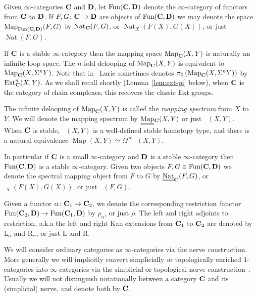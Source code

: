 \documentclass[psamsfonts]{amsart}
\theoremstyle{plain}
\theoremstyle{definition}
\theoremstyle{remark}
\newcommand{\catname}[1]{{\normalfont\textbf{#1}}}
\newcommand{\lkan}{\mathrm{L}}
\newcommand{\rkan}{\mathrm{R}}
\DeclareMathOperator{\ext}{Ext}
\DeclareMathOperator{\map}{Map}
\DeclareMathOperator{\spectralmaps}{\underline{\underline{\map}}}
\DeclareMathOperator{\nat}{Nat}
\DeclareMathOperator{\spectralNat}{\underline{\underline{\nat}}}
\DeclareMathOperator{\fun}{Fun}
\begin{document}
Given $\infty$-categories $\catname{C}$ and $\catname{D}$, let $\fun(\catname{C}, \catname{D})$ denote the $\infty$-category of functors from $\catname{C}$ to $\catname{D}$. If $F, G\colon \catname{C}\to \catname{D}$ are objects of $\fun(\catname{C}, \catname{D})$ we may denote the space $\map_{\fun(\catname{C}, \catname{D})}(F, G)$ by $\nat_{\catname{C}}(F, G)$, or $\nat_X(F(X), G(X))$, or just $\nat(F, G)$. 

If $\catname{C}$ is a stable $\infty$-category then the mapping space $\map_{\catname{C}}(X, Y)$ is naturally an infinite loop space. The $n$-fold delooping of $\map_{\catname{C}}(X, Y)$ is equivalent to $\map_{\catname{C}}(X, \Sigma^n Y)$. Note that in~\cite{LurieHA} Lurie sometimes denotes $\pi_0\left(\map_{\catname{C}}(X, \Sigma^n Y)\right)$ by $\ext^n_{\catname{C}}(X, Y)$. As we shall recall shortly (Lemma~\ref{lem:ext-pi} below), when $\catname{C}$ is the category of chain complexes, this recovers the classic Ext groups.

The infinite delooping of $\map_{\catname{C}}(X, Y)$ is called the {\it mapping spectrum} from $X$ to $Y$. We will denote the mapping spectrum by %
$\spectralmaps\hphantom{.}_{\!\!\! \catname{C}}(X, Y)$ or just $\spectralmaps(X, Y)$. When $\catname{C}$ is stable, $\spectralmaps(X, Y)$ is a well-defined stable homotopy type, and there is a natural equivalence $\map(X, Y)\simeq \Omega^\infty \spectralmaps(X, Y)$.

In particular if $\catname{C}$ is a small $\infty$-category and $\catname{D}$ is a stable $\infty$-category then $\fun(\catname{C}, \catname{D})$ is a stable $\infty$-category. Given two objects $F, G\in \fun(\catname{C}, \catname{D})$ we denote the spectral mapping object from $F$ to $G$ by $\spectralNat_{\catname{C}}(F, G)$, or $\spectralNat_X(F(X), G(X))$, or just $\spectralNat(F, G)$.

Given a functor $\alpha\colon \catname{C}_1\to\catname{C}_2$, we denote the corresponding restriction functor $\fun(\catname{C}_2, \catname{D})\to \fun(\catname{C}_1, \catname{D})$ by $\rho_\alpha$, or just $\rho$. The left and right adjoints to restriction, a.k.a the left and right Kan extensions from $\catname{C}_1$ to $\catname{C}_2$ are denoted by $\lkan_\alpha$ and $\rkan_\alpha$, or just $\lkan$ and $\rkan$.

We will consider ordinary categories as $\infty$-categories via the nerve construction. More generally we will implicitly convert simplicially or topologically enriched $1$-categories into $\infty$-categories via the simplicial or topological nerve construction~\cite[Definition 1.1.5.5]{LurieHTT}. Usually we will not distinguish notationally between a category $\catname{C}$ and its (simplicial) nerve, and denote both by $\catname{C}$.
\end{document}
